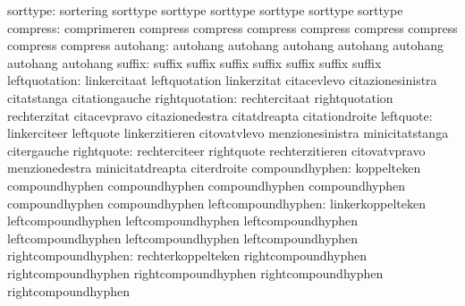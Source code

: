                  sorttype: sortering                 sorttype
                           sorttype                  sorttype
                           sorttype                  sorttype
                           sorttype
                 compress: comprimeren               compress
                           compress                  compress
                           compress                  compress
                           compress                  compress
                           compress
                 autohang: autohang                  autohang
                           autohang                  autohang
                           autohang                  autohang
                           autohang
                   suffix: suffix                    suffix
                           suffix                    suffix
                           suffix                    suffix
                           suffix
            leftquotation: linkercitaat              leftquotation
                           linkerzitat               citacevlevo
                           citazionesinistra         citatstanga
                           citationgauche
           rightquotation: rechtercitaat             rightquotation
                           rechterzitat              citacevpravo
                           citazionedestra           citatdreapta
                           citationdroite
                leftquote: linkerciteer              leftquote
                           linkerzitieren            citovatvlevo
                           menzionesinistra          minicitatstanga
                           citergauche
               rightquote: rechterciteer             rightquote
                           rechterzitieren           citovatvpravo
                           menzionedestra            minicitatdreapta
                           citerdroite
           compoundhyphen: koppelteken               compoundhyphen
                           compoundhyphen            compoundhyphen
                           compoundhyphen            compoundhyphen
                           compoundhyphen
       leftcompoundhyphen: linkerkoppelteken         leftcompoundhyphen
                           leftcompoundhyphen        leftcompoundhyphen
                           leftcompoundhyphen        leftcompoundhyphen
                           leftcompoundhyphen
      rightcompoundhyphen: rechterkoppelteken        rightcompoundhyphen
                           rightcompoundhyphen       rightcompoundhyphen
                           rightcompoundhyphen       rightcompoundhyphen
